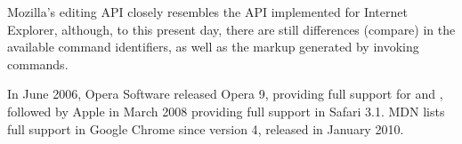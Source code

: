Mozilla's editing API closely resembles the API implemented for Internet Explorer, although, to this present day, there are still differences (compare\cite{ad}\cite{am}) in the available command identifiers,\cite{am}\cite{ad} as well as the markup generated by invoking commands\cite{ai}. 




In June 2006, Opera Software released Opera 9\cite{ap}, providing full support for  and \cite{aq}, followed by Apple in March 2008\cite{ar} providing full support in Safari 3.1\cite{caniuse_contenteditable}. MDN lists full support in Google Chrome since version 4\cite{as}, released in January 2010\cite{at}.






